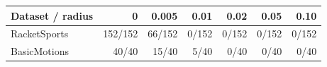 \begin{tabular}{lrrrrrr}\toprule
Dataset / radius & 0 & 0.005 & 0.01 & 0.02 & 0.05 & 0.10 \\ \midrule
RacketSports & 152/152 & 66/152 & 0/152 & 0/152 & 0/152 & 0/152 \\
BasicMotions & 40/40 & 15/40 & 5/40 & 0/40 & 0/40 & 0/40 \\
\bottomrule\end{tabular}